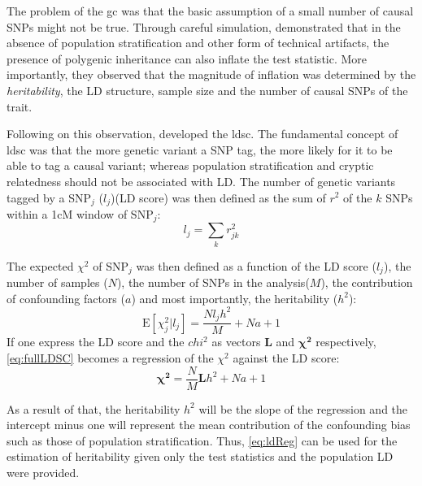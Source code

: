 \documentclass[12pt]{book}
\begin{document}
	The problem of the \gls{gc} was that the basic assumption of a small number of causal \glspl{SNP} might not be true. 
	Through careful simulation, \citet{Yang2011b} demonstrated that in the absence of population stratification and other form of technical artifacts, the presence of polygenic inheritance can also inflate the test statistic\citep{Yang2011b}.
	More importantly, they observed that the magnitude of inflation was determined by the \emph{heritability}, the \gls{LD} structure, sample size and the number of causal \glspl{SNP} of the trait.

	Following on this observation, \citet{Bulik-Sullivan2015} developed the \gls{ldsc}.
	The fundamental concept of \gls{ldsc} was that the more genetic variant a \gls{SNP} tag, the more likely for it to be able to tag a causal variant; 
	whereas population stratification and cryptic relatedness should not be associated with \gls{LD}.
	The number of genetic variants tagged by a \gls{SNP}$_j$ ($l_j$)(\gls{LD} score) was then defined as the sum of $r^2$ of the $k$ \glspl{SNP} within a 1cM window of \gls{SNP}$_j$:
	\begin{equation}
	l_j = \sum_kr^2_{jk}
	\label{eq:ldScore}
	\end{equation}
	
	The expected $\chi^2$ of \gls{SNP}$_j$ was then defined as a function of the \gls{LD} score ($l_j$), the number of samples ($N$), the number of \glspl{SNP} in the analysis($M$), the contribution of confounding factors ($a$) and most importantly, the heritability ($h^2$):
	\begin{equation}
	\mathrm{E}[\chi^2_j | l_j] = \frac{Nl_jh^2}{M}+Na+1
	\label{eq:fullLDSC}
	\end{equation}
	If one express the \gls{LD} score and the $chi^2$ as vectors $\boldsymbol{L}$ and $\boldsymbol{\chi^2}$ respectively, \cref{eq:fullLDSC} becomes a regression of the $\chi^2$ against the \gls{LD} score:
	\begin{equation}
	\boldsymbol{\chi^2}= \frac{N}{M}\boldsymbol{L}h^2+Na+1
	\label{eq:ldReg}
	\end{equation}
	
	As a result of that, the heritability $h^2$ will be the slope of the regression and the intercept minus one will represent the mean contribution of the confounding bias such as those of population stratification. 
	Thus, \cref{eq:ldReg} can be used for the estimation of heritability given only the test statistics and the population \gls{LD} were provided. 
	
\end{document}

